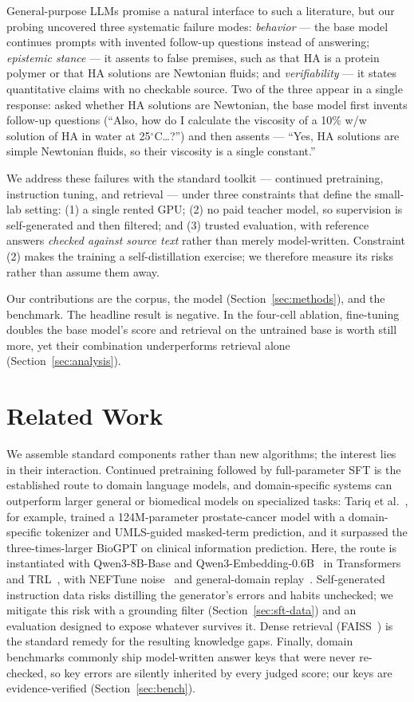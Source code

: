 \documentclass[11pt]{article}
\begin{document}
General-purpose LLMs promise a natural interface to such a literature,
but our probing uncovered three systematic failure modes:
\emph{behavior} --- the base model continues prompts with invented
follow-up questions instead of answering; \emph{epistemic stance} ---
it assents to false premises, such as that HA is a protein polymer or
that HA solutions are Newtonian fluids; and \emph{verifiability} --- it
states quantitative claims with no checkable source. Two of the three
appear in a single response: asked whether HA solutions are Newtonian,
the base model first invents follow-up questions (``Also, how do I
calculate the viscosity of a 10\% w/w solution of HA in water at
25$^\circ$C\ldots?'') and then assents --- ``Yes, HA solutions are
simple Newtonian fluids, so their viscosity is a single constant.''

We address these failures with the standard toolkit --- continued
pretraining, instruction tuning, and retrieval --- under three
constraints that define the small-lab setting: (1) a single rented GPU;
(2) no paid teacher model, so supervision is self-generated and then
filtered; and (3) trusted evaluation, with reference answers
\emph{checked against source text} rather than merely model-written.
Constraint (2) makes the training a self-distillation exercise; we
therefore measure its risks rather than assume them away.

Our contributions are the corpus, the model
(Section~\ref{sec:methods}), and the benchmark. The headline result is
negative. In the four-cell ablation, fine-tuning doubles the base
model's score and retrieval on the untrained base is worth still more,
yet their combination underperforms retrieval alone
(Section~\ref{sec:analysis}).

\section{Related Work}
\label{sec:related}

We assemble standard components rather than new algorithms; the
interest lies in their interaction. Continued pretraining followed by
full-parameter SFT is the established route to domain language models,
and domain-specific systems can outperform larger general
or biomedical models on specialized tasks: Tariq et
al.~\cite{tariq2024}, for example, trained a 124M-parameter
prostate-cancer model with a domain-specific tokenizer and UMLS-guided
masked-term prediction, and it surpassed the three-times-larger BioGPT
on clinical information prediction. Here, the route is instantiated
with Qwen3-8B-Base and Qwen3-Embedding-0.6B~\cite{qwen3} in
Transformers and TRL~\cite{transformers,trl}, with NEFTune
noise~\cite{neftune} and general-domain replay~\cite{fineweb}.
Self-generated instruction data risks distilling the generator's errors
and habits unchecked; we mitigate this risk with a grounding filter
(Section~\ref{sec:sft-data}) and an evaluation designed to expose
whatever survives it. Dense retrieval (FAISS~\cite{faiss}) is the
standard remedy for the resulting knowledge gaps. Finally, domain
benchmarks commonly ship model-written answer keys that were never
re-checked, so key errors are silently inherited by every judged score;
our keys are evidence-verified (Section~\ref{sec:bench}).
\end{document}
